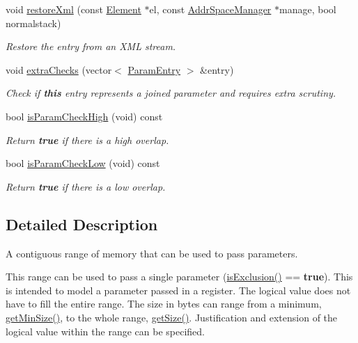 \begin{DoxyCompactItemize}
void \mbox{\hyperlink{class_param_entry_a53c2087cab53baf85ca84cf830146cd4}{restore\+Xml}} (const \mbox{\hyperlink{class_element}{Element}} $\ast$el, const \mbox{\hyperlink{class_addr_space_manager}{Addr\+Space\+Manager}} $\ast$manage, bool normalstack)
\begin{DoxyCompactList}\small\item\em Restore the entry from an X\+ML stream. \end{DoxyCompactList}\item 
void \mbox{\hyperlink{class_param_entry_af0636e640bf34fb2d6a27f1daa39ba24}{extra\+Checks}} (vector$<$ \mbox{\hyperlink{class_param_entry}{Param\+Entry}} $>$ \&entry)
\begin{DoxyCompactList}\small\item\em Check if {\bfseries{this}} entry represents a {\itshape joined} parameter and requires extra scrutiny. \end{DoxyCompactList}\item 
bool \mbox{\hyperlink{class_param_entry_ac4acfd4bea55a34fedd04931b29b4f8c}{is\+Param\+Check\+High}} (void) const
\begin{DoxyCompactList}\small\item\em Return {\bfseries{true}} if there is a high overlap. \end{DoxyCompactList}\item 
bool \mbox{\hyperlink{class_param_entry_a7dd16288914ec41f8936095d74d943f1}{is\+Param\+Check\+Low}} (void) const
\begin{DoxyCompactList}\small\item\em Return {\bfseries{true}} if there is a low overlap. \end{DoxyCompactList}\end{DoxyCompactItemize}


\subsection{Detailed Description}
A contiguous range of memory that can be used to pass parameters. 

This range can be used to pass a single parameter (\mbox{\hyperlink{class_param_entry_a1c72a43ac9238f9fae35f38b88ef2010}{is\+Exclusion()}} == {\bfseries{true}}). This is intended to model a parameter passed in a register. The logical value does not have to fill the entire range. The size in bytes can range from a minimum, \mbox{\hyperlink{class_param_entry_a6cf83bdd06247d2ca0f6b5c663f94ecb}{get\+Min\+Size()}}, to the whole range, \mbox{\hyperlink{class_param_entry_a14b9358afc509b2d9df494ea6ecfbe31}{get\+Size()}}. Justification and extension of the logical value within the range can be specified.

